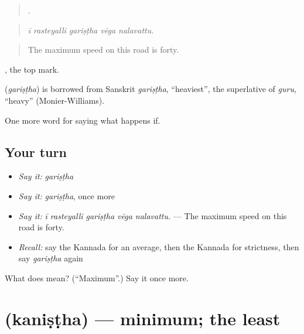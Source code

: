\begin{quote}
    .
\end{quote}

\begin{quote}
\emph{ī rasteyalli gariṣṭha vēga nalavattu.}
\end{quote}

\begin{quote}
The maximum speed on this road is forty.
\end{quote}

 , the top mark.

\begin{cousinweb}
\textbf{} (\emph{gariṣṭha}) is borrowed from Sanskrit \emph{gariṣṭha}, \textquotedblleft{}heaviest\textquotedblright{}, the superlative of \emph{guru}, \textquotedblleft{}heavy\textquotedblright{} (Monier-Williams).
\end{cousinweb}

\begin{grammarlens}[title={What you've built}]
One more word for saying what happens if.
\end{grammarlens}

\subsection*{Your turn}
\begin{itemize}
\raggedright
  \item \emph{Say it:} \emph{gariṣṭha}
  \item \emph{Say it:} \emph{gariṣṭha}, once more
  \item \emph{Say it:} \emph{ī rasteyalli gariṣṭha vēga nalavattu.} — The maximum speed on this road is forty.
  \item \emph{Recall:} say the Kannada for an average, then the Kannada for strictness, then say \emph{gariṣṭha} again
\end{itemize}

\begin{tcolorbox}[breakable,colback=teal!4,colframe=teal!35!black,title={Before you move on}]
What does  mean? (\textquotedblleft{}Maximum\textquotedblright{}.) Say it once more.
\end{tcolorbox}
\section[\texorpdfstring{\kn{ಕನಿಷ್ಠ} (kaniṣṭha)}{ಕನಿಷ್ಠ (kaniṣṭha)}]{ (kaniṣṭha) — minimum; the least}

